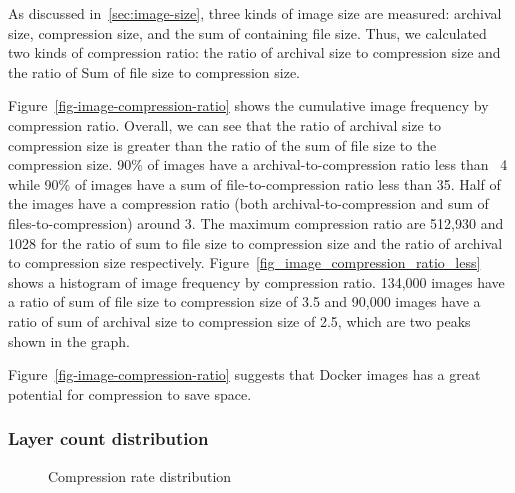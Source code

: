 As discussed in~\ref{sec:image-size}, three kinds of image size are measured: archival size, compression size, and the sum of containing file size. Thus, we calculated two kinds of compression ratio: the ratio of archival size to compression size and the ratio of Sum of file size to compression size. 

Figure~\ref{fig-image-compression-ratio} shows the cumulative image frequency by compression ratio. Overall, we can see that the ratio of archival size to compression size is greater than the ratio of the sum of file size to the compression size. 90\% of images have a archival-to-compression ratio less than ~4 while 90\% of images have a sum of file-to-compression ratio less than 35. Half of the images have a compression ratio (both archival-to-compression and sum of files-to-compression) around 3. The maximum compression ratio are 512,930 and 1028 for the ratio of sum to file size to compression size and the ratio of archival to compression size respectively.
Figure~\ref{fig_image_compression_ratio_less} shows a histogram of image frequency by compression ratio. 134,000 images have a ratio of sum of file size to compression size of 3.5 and 90,000 images have a ratio of sum of archival size to compression size of 2.5, which are two peaks shown in the graph.

Figure~\ref{fig-image-compression-ratio} suggests that Docker images has a great potential for compression to save space.

\subsubsection{Layer count distribution}

\begin{figure}[!t]
	\centering
	\caption{Compression rate distribution}
	\label{fig-layer-cnt}
\end{figure}


